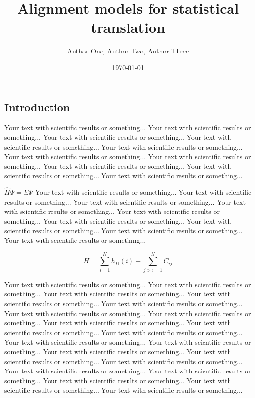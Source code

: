 \documentclass[final]{beamer}
\title
[Probabilistic Graphical Models Poster Session, 1 - 4 Jan 2017] %
{ %
Alignment models for statistical translation
}
\author{ %
Author One\inst{1}, Author Two\inst{2}, Author Three\inst{2,3}
}
\institute
[Very Large University] %
{
\inst{1} Very Large University, Neverland\\[0.3ex]
\inst{2} Other University, Neverland\\[0.3ex]
\inst{3} Yet Another University, Neverland
}
\date{\today}
\begin{document}
\begin{frame}[t]
\begin{multicols}{3}

\section{Introduction}

Your text with scientific results or something... 
Your text with scientific results or something... 
Your text with scientific results or something... 
Your text with scientific results or something... 
Your text with scientific results or something... 
Your text with scientific results or something... 
Your text with scientific results or something... 
Your text with scientific results or something... 
Your text with scientific results or something... 
Your text with scientific results or something... 

 $\hat H \Psi = E \Psi$  
Your text with scientific results or something... 
Your text with scientific results or something... 
Your text with scientific results or something... 
Your text with scientific results or something... 
Your text with scientific results or something... 
Your text with scientific results or something... 
Your text with scientific results or something... 
Your text with scientific results or something... 
Your text with scientific results or something...

\begin{equation}
H = \sum_{i=1}^{N} h_{D}(i) + \sum_{j>i=1}^{N} C_{ij}
\end{equation}

Your text with scientific results or something... 
Your text with scientific results or something... 
Your text with scientific results or something... 
Your text with scientific results or something... 
Your text with scientific results or something... 
Your text with scientific results or something... 
Your text with scientific results or something... 
Your text with scientific results or something... 
Your text with scientific results or something... 
Your text with scientific results or something... 
Your text with scientific results or something... 
Your text with scientific results or something... 
Your text with scientific results or something... 
Your text with scientific results or something... 
Your text with scientific results or something... 
Your text with scientific results or something... 
Your text with scientific results or something... 
Your text with scientific results or something... 
Your text with scientific results or something... 
Your text with scientific results or something...


\end{multicols}
\end{frame}
\end{document}
